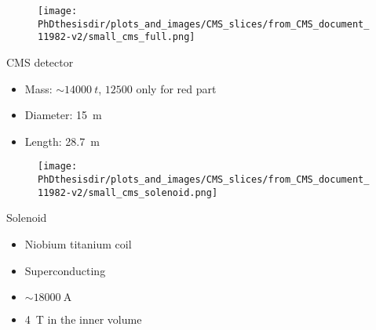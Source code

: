 \begin{frame}
\begin{minipage}[t]{.6\textwidth}
\begin{figure}
\texttt{[image: \\PhDthesisdir/plots\_and\_images/CMS\_slices/from\_CMS\_document\_11982-v2/small\_cms\_full.png]}
\end{figure}
\end{minipage}
\hfill\begin{minipage}[t]{.35\textwidth}
\begin{block}{CMS detector}
\begin{itemize}
\item Mass: $\sim\SI{14000}{t}$, $\num{12500}$ only for red part
\item Diameter: \SI{15}{\meter}
\item Length: \SI{28.7}{\meter}
\end{itemize}
\end{block}
\end{minipage}
\end{frame}

\begin{frame}
\addtocounter{framenumber}{-1}
\transdissolve
\begin{minipage}[t]{.6\textwidth}
\begin{figure}
\texttt{[image: \\PhDthesisdir/plots\_and\_images/CMS\_slices/from\_CMS\_document\_11982-v2/small\_cms\_solenoid.png]}
\end{figure}
\end{minipage}
\hfill\begin{minipage}[t]{.35\textwidth}
\begin{block}{Solenoid}
\begin{itemize}
\item Niobium titanium coil
\item Superconducting
\item $\sim\SI{18000}{\ampere}$
\item \SI{4}{\tesla} in the inner volume
\end{itemize}
\end{block}
\end{minipage}
\end{frame}

